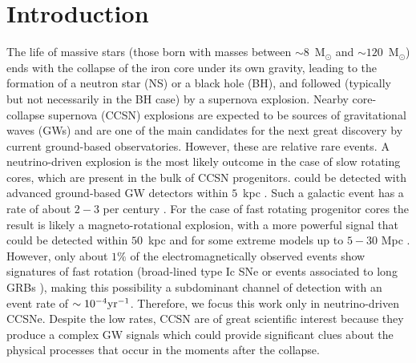 
\section{Introduction}


The life of massive stars {(those born with masses between $\sim 8$~M$_\odot$ and $\sim 120$~M$_\odot$)} ends with the collapse of {the} iron core under {its} own gravity, leading {to} the formation of a neutron star {(NS)} or a black hole (BH), {and} followed (typically but not necessarily in the BH case) by {a supernova} explosion. {Nearby} core-collapse supernova (CCSN) explosions {are expected to be sources of gravitational waves (GWs) and are one of the main candidates for the next great discovery by current ground-based observatories. However, these are relative rare events. A neutrino-driven explosion \citep{Bethe:1990} is the most likely outcome in the case of slow rotating cores, which are present in the bulk of CCSN progenitors.
 could be detected with advanced ground-based GW detectors  within $5$~kpc \citep{Gossan:2016,TargetedSNSearchO12}. Such a galactic event has a rate of about $2-3$ per century \citep{Adams:2013,Rozwadowska:2021}.
For the case of fast rotating progenitor cores the result is likely a magneto-rotational explosion, with } a more powerful  signal {that could} be detected {within $50$~kpc and for some extreme models 
up to $5-30$ Mpc \citep{Gossan:2016,TargetedSNSearchO12}. However, only about $1\%$ of the electromagnetically observed events show signatures of fast rotation (broad-lined type Ic SNe \citep{Li:2011b} or events associated to long GRBs 
\citep{Chapman:2007}), making this possibility a subdominant channel of detection with an event rate of $\sim 10^{-4} \rm{yr}^{-1}$. Therefore, we focus this work only in neutrino-driven CCSNe. 
Despite the low rates, CCSN are of great scientific interest because they produce} a complex GW signals which could provide significant clues about the physical processes that occur in the moments after the collapse. 

